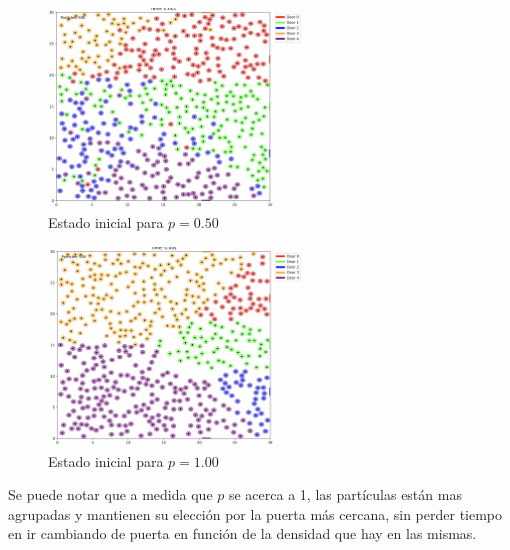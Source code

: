 \documentclass[12pt]{article}
\begin{document}
\begin{figure}[H]
\centering
\includegraphics[width=0.6\textwidth]{img/frames/t_20_&_p_0.50.jpg}
\caption{Estado inicial para $p=0.50$}
\label{fig:evac_time_ct}
\end{figure}

\begin{figure}[H]
\centering
\includegraphics[width=0.6\textwidth]{img/frames/t_20_&_p_1.00.jpg}
\caption{Estado inicial para $p=1.00$}
\label{fig:evac_time_ct}
\end{figure}
Se puede notar que a medida que $p$ se acerca a 1, las partículas están mas agrupadas y mantienen su elección por la puerta más cercana, sin perder tiempo en ir cambiando de puerta en función de la densidad que hay en las mismas.
\end{document}
